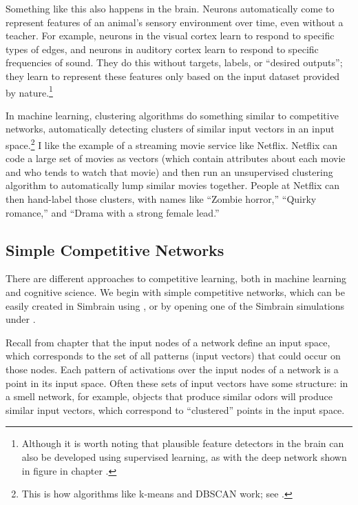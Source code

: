 Something like this also happens in the brain. Neurons automatically come to represent features of an animal's sensory environment over time, even without a teacher. For example, neurons in the visual cortex learn to respond to specific types of edges, and neurons in auditory cortex learn to respond to specific frequencies of sound. They do this without targets, labels, or ``desired outputs''; they learn to represent these features only based on the input dataset provided by nature.\footnote{Although it is worth noting that plausible feature detectors in the brain can also be developed using supervised learning, as with the deep network shown in figure   in chapter .}

In machine learning, clustering algorithms do something similar to competitive networks, automatically detecting clusters of similar input vectors in an input space.\footnote{This is how algorithms like k-means and DBSCAN work; see .} I like the example of a streaming movie service like Netflix. Netflix can code a large set of movies as vectors (which contain attributes about each movie and who tends to watch that movie) and then run an unsupervised clustering algorithm to automatically lump similar movies together. People at Netflix can then hand-label those clusters, with names like ``Zombie horror,'' ``Quirky romance,'' and ``Drama with a strong female lead.''

\subsection{Simple Competitive Networks}

There are different approaches to competitive learning, both in machine learning and cognitive science. We begin with simple competitive networks, which can be easily created in Simbrain using , or by opening one of the Simbrain simulations under .

Recall from chapter  that the input nodes of a network define an input space, which corresponds to the set of all patterns (input vectors) that could occur on those nodes. Each pattern of activations over the input nodes of a network is a point in its input space. Often these sets of input vectors have some structure: in a smell network, for example, objects that produce similar odors will produce similar input vectors, which correspond to ``clustered'' points in the input space. 

